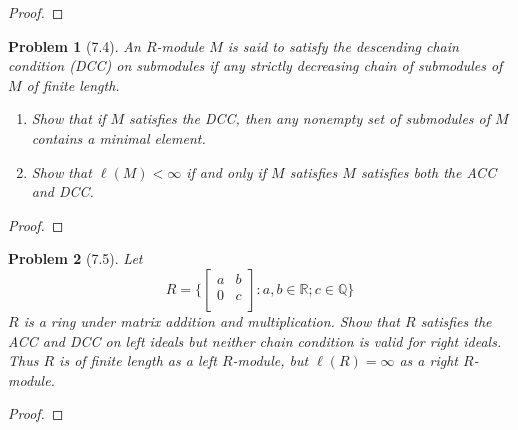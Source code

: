 \documentclass[10pt]{article}
\newcommand{\sk}{\vskip 10mm}
\newcommand{\bb}[1]{\mathbb{#1}}
\theoremstyle{plain}
\newtheorem{problem}{Problem}
\theoremstyle{remark}
\begin{document}
\begin{proof}
  
\end{proof}

\sk

\begin{problem}[7.4]
  An $R$-module $M$ is said to satisfy the descending chain condition (DCC)
  on submodules if any strictly decreasing chain of submodules of $M$ of
  finite length.
  \begin{enumerate}
  \item[(a)] Show that if $M$ satisfies the DCC, then any nonempty set
    of submodules of $M$ contains a minimal element.
  \item[(b)] Show that $\ell(M)<\infty$ if and only if $M$ satisfies $M$
    satisfies both the ACC and DCC.
  \end{enumerate}
\end{problem}

\begin{proof}
  
\end{proof}

\sk

\begin{problem}[7.5]
  Let
  \[
    R=
    \{
    \left[
      \begin{array}{cc}
        a&b\\
        0&c\\
      \end{array}
    \right]
    :
    a,b\in\bb{R}; c\in\bb{Q}
    \}
  \]
  $R$ is a ring under matrix addition and multiplication. Show that $R$
  satisfies the ACC and DCC on left ideals but neither chain condition
  is valid for right ideals. Thus $R$ is of finite length as a left
  $R$-module, but $\ell(R)=\infty$ as a right $R$-module.
\end{problem}

\begin{proof}
  
\end{proof}

\sk
\end{document}
